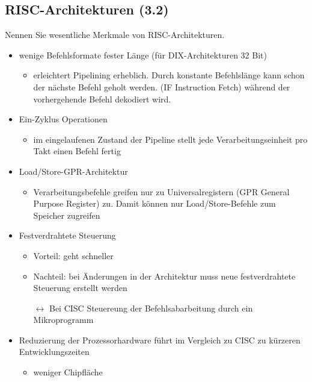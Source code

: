 \subsection{RISC-Architekturen (3.2)}
Nennen Sie wesentliche Merkmale von RISC-Architekturen.
\begin{itemize}
	\item wenige Befehlsformate fester Länge (für DIX-Architekturen 32 Bit)
	\begin{itemize}
		\item erleichtert Pipelining erheblich. Durch konstante Befehlslänge kann schon der nächste Befehl geholt werden. (IF Instruction Fetch) während der vorhergehende Befehl dekodiert wird.
	\end{itemize}
	\item Ein-Zyklus Operationen
	\begin{itemize}
		\item im eingelaufenen Zustand der Pipeline stellt jede Verarbeitungseinheit pro Takt einen Befehl fertig
	\end{itemize}
	\item Load/Store-GPR-Architektur
	\begin{itemize}
		\item Verarbeitungsbefehle greifen nur zu Universalregistern (GPR General Purpose Register) zu. Damit können nur Load/Store-Befehle zum Speicher zugreifen
	\end{itemize}
	\item Festverdrahtete Steuerung
	\begin{itemize}
		\item Vorteil: geht schneller
		\item Nachteil: bei Änderungen in der Architektur muss neue festverdrahtete Steuerung erstellt werden
		\item[$\leftrightarrow$] Bei CISC Steuereung der Befehlsabarbeitung durch ein Mikroprogramm
	\end{itemize}
	\item Reduzierung der Prozessorhardware führt im Vergleich zu CISC zu kürzeren Entwicklungszeiten
	\begin{itemize}
		\item weniger Chipfläche
	\end{itemize}
\end{itemize}
